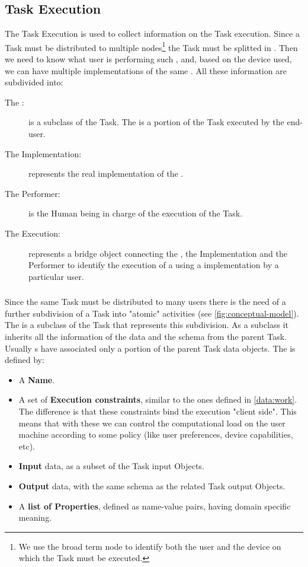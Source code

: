 \subsection{Task Execution}
The Task Execution is used to collect information on the Task execution. Since
a Task must be distributed to multiple nodes\footnote{We use the broad term node
to identify both the user and the device on which the Task must be executed.} the
Task must be splitted in \utask{}. Then we need to know what user is performing
such \utask{}, and, based on the device used, we can have multiple implementations
of the same \utask{}. All these information are subdivided into:
\begin{description}
    \item[The \utask{}:] is a subclass of the Task. The \utask{} is a portion
    of the Task executed by the end-user.
    \item[The \utask{} Implementation:] represents the real implementation
    of the \utask{}.
    \item[The Performer:] is the Human being in charge of the execution of the
    Task.
    \item[The Execution:] represents a bridge object connecting the \utask{},
    the \utask{} Implementation and the Performer to identify the execution of a
    \utask{} using a \utask{} implementation by a particular user.
\end{description}


\subsubsection{\utask{}}
Since the same Task must be distributed to many users there is the need of a
further subdivision of a Task into "atomic" activities (see
\autoref{fig:conceptual-model}).
The \utask{} is a subclass of the Task that represents this subdivision. As
a subclass it inherits all the information of the data and the schema from the
parent Task. Usually \utask{}s have associated only a portion of the parent
Task data objects. The \utask{} is defined by:
\begin{itemize}
    \item A \textbf{Name}.
    
    \item A set of \textbf{Execution constraints}, similar to the ones defined
    in \ref{data:work}. The difference is that these constraints bind the
    execution "client side". This means that with these we can control the
    computational load on the user machine according to some policy (like
    user preferences, device capabilities, etc).
    
    \item \textbf{Input} data, as a subset of the Task input Objects.
    \item \textbf{Output} data, with the same schema as the related Task output
    Objects.
    
    \item A \textbf{list of Properties}, defined as name-value pairs, having
    domain specific meaning.
\end{itemize}


